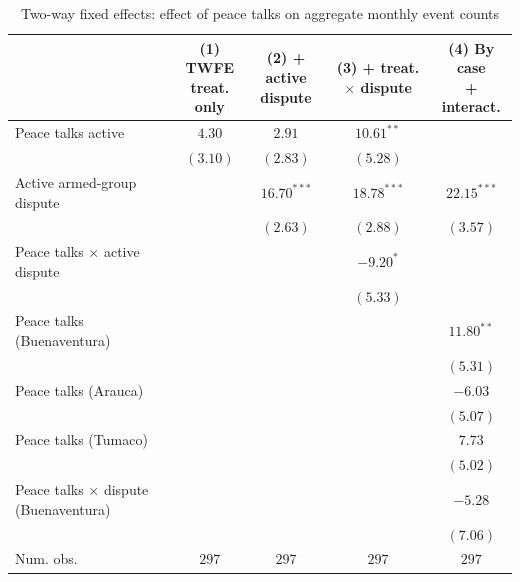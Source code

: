 
\begin{table}
\caption{Two-way fixed effects: effect of peace talks on aggregate monthly event counts}
\begin{center}
\begin{tabular}{l c c c c}
\toprule
 & \makecell{(1) TWFE\\treat. only} & \makecell{(2) + active\\dispute} & \makecell{(3) + treat.$\times$\\dispute} & \makecell{(4) By case\\+ interact.} \\
\midrule
Peace talks active                   & $4.30$   & $2.91$        & $10.61^{**}$  &               \\
                                     & $(3.10)$ & $(2.83)$      & $(5.28)$      &               \\
Active armed-group dispute           &          & $16.70^{***}$ & $18.78^{***}$ & $22.15^{***}$ \\
                                     &          & $(2.63)$      & $(2.88)$      & $(3.57)$      \\
Peace talks × active dispute         &          &               & $-9.20^{*}$   &               \\
                                     &          &               & $(5.33)$      &               \\
Peace talks (Buenaventura)           &          &               &               & $11.80^{**}$  \\
                                     &          &               &               & $(5.31)$      \\
Peace talks (Arauca)                 &          &               &               & $-6.03$       \\
                                     &          &               &               & $(5.07)$      \\
Peace talks (Tumaco)                 &          &               &               & $7.73$        \\
                                     &          &               &               & $(5.02)$      \\
Peace talks × dispute (Buenaventura) &          &               &               & $-5.28$       \\
                                     &          &               &               & $(7.06)$      \\
\midrule
Num. obs.                            & $297$    & $297$         & $297$         & $297$         \\

\end{tabular}
\end{center}
\end{table}
